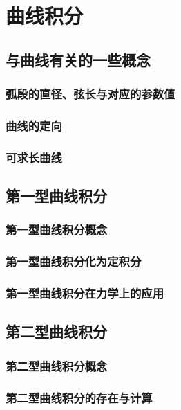 

\chapter{曲线积分}\label{ch:21}
\section{与曲线有关的一些概念}
\subsection{弧段的直径、弦长与对应的参数值}
\subsection{曲线的定向}
\subsection{可求长曲线}
\begin{exercise}
\item
\end{exercise}
\section{第一型曲线积分}
\subsection{第一型曲线积分概念}
\subsection{第一型曲线积分化为定积分}
\subsection{第一型曲线积分在力学上的应用}
\begin{exercise}
\item
\end{exercise}
\section{第二型曲线积分}
\subsection{第二型曲线积分概念}
\subsection{第二型曲线积分的存在与计算}
